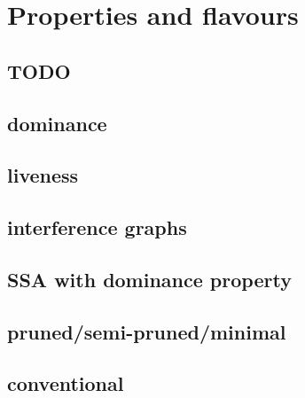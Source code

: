 \chapter{Properties and flavours }
\section{TODO}

\section{dominance}
\section{liveness}
\section{interference graphs}
\section{SSA with dominance property}
\section{pruned/semi-pruned/minimal}
\section{conventional}

